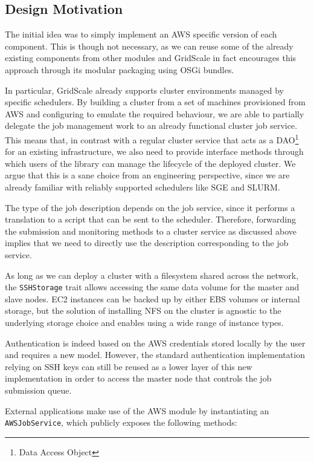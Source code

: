 \subsection{Design Motivation} \label{DesignMotivationSection}

The initial idea was to simply implement an AWS specific version of each component. This is though not necessary, as we can reuse some of the already existing components from other modules and GridScale in fact encourages this approach through its modular packaging using OSGi bundles.

In particular, GridScale already supports cluster environments managed by specific schedulers. By building a cluster from a set of machines provisioned from AWS and configuring to emulate the required behaviour, we are able to partially delegate the job management work to an already functional cluster job service. This means that, in contrast with a regular cluster service that acts as a DAO\footnote{Data Access Object} for an existing infrastructure, we also need to provide interface methods through which users of the library can manage the lifecycle of the deployed cluster. We argue that this is a sane choice from an engineering perspective, since we are already familiar with reliably supported schedulers like SGE and SLURM.

The type of the job description depends on the job service, since it performs a translation to a script that can be sent to the scheduler. Therefore, forwarding the submission and monitoring methods to a cluster service as discussed above implies that we need to directly use the description corresponding to the job service.

As long as we can deploy a cluster with a filesystem shared across the network, the \verb|SSHStorage| trait allows accessing the same data volume for the master and slave nodes. EC2 instances can be backed up by either EBS volumes or internal storage, but the solution of installing NFS on the cluster is agnostic to the underlying storage choice and enables using a wide range of instance types.

Authentication is indeed based on the AWS credentials stored locally by the user and requires a new model. However, the standard authentication implementation relying on SSH keys can still be reused as a lower layer of this new implementation in order to access the master node that controls the job submission queue.

External applications make use of the AWS module by instantiating an \verb|AWSJobService|, which publicly exposes the following methods:

